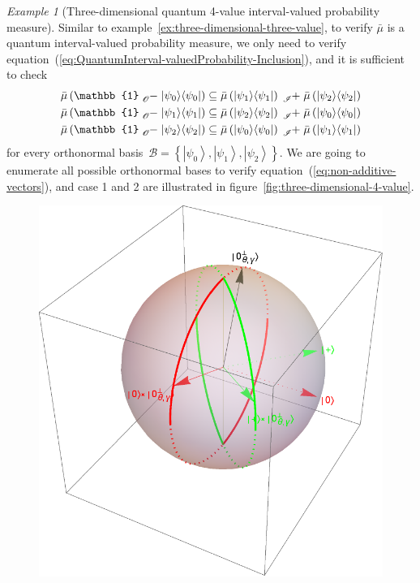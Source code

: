 \documentclass{article}
\theoremstyle{remark}
\newtheorem{example}{Example}
\newcommand{\ket}[1]{{\left\vert{#1}\right\rangle}}
\newcommand{\op}[2]{\ensuremath{\left\vert{#1}\middle\rangle\middle\langle{#2}\right\vert}}
\newcommand{\proj}[1]{\op{#1}{#1}}
\begin{document}
\begin{example}[Three-dimensional quantum 4-value interval-valued
probability measure]
Similar to example~\ref{ex:three-dimensional-three-value}, to verify
$\bar{\mu}$ is a quantum interval-valued probability measure, we
only need to verify equation~(\ref{eq:QuantumInterval-valuedProbability-Inclusion}),
and it is sufficient to check 
\begin{equation}
\begin{aligned}\bar{\mu}\left(\mathbb{1}\tensor*[_{\mathscr{O}}]{-}{}\proj{\psi_{0}}\right) & \subseteq\bar{\mu}\left(\proj{\psi_{1}}\right)\tensor*[_{\mathscr{I}}]{+}{}\bar{\mu}\left(\proj{\psi_{2}}\right)\\
\bar{\mu}\left(\mathbb{1}\tensor*[_{\mathscr{O}}]{-}{}\proj{\psi_{1}}\right) & \subseteq\bar{\mu}\left(\proj{\psi_{2}}\right)\tensor*[_{\mathscr{I}}]{+}{}\bar{\mu}\left(\proj{\psi_{0}}\right)\\
\bar{\mu}\left(\mathbb{1}\tensor*[_{\mathscr{O}}]{-}{}\proj{\psi_{2}}\right) & \subseteq\bar{\mu}\left(\proj{\psi_{0}}\right)\tensor*[_{\mathscr{I}}]{+}{}\bar{\mu}\left(\proj{\psi_{1}}\right)
\end{aligned}
\label{eq:non-additive-vectors}
\end{equation}
for every orthonormal basis~$\mathcal{B}=\left\{ \ket{\psi_{0}},\ket{\psi_{1}},\ket{\psi_{2}}\right\} $.
We are going to enumerate all possible orthonormal bases to verify
equation~(\ref{eq:non-additive-vectors}), and case 1 and 2 are illustrated
in figure~\ref{fig:three-dimensional-4-value}. 
\begin{center}
\begin{figure}
\includegraphics[scale=0.4]{measure4.pdf}

\end{figure}
\end{center}
\end{example}
\end{document}
